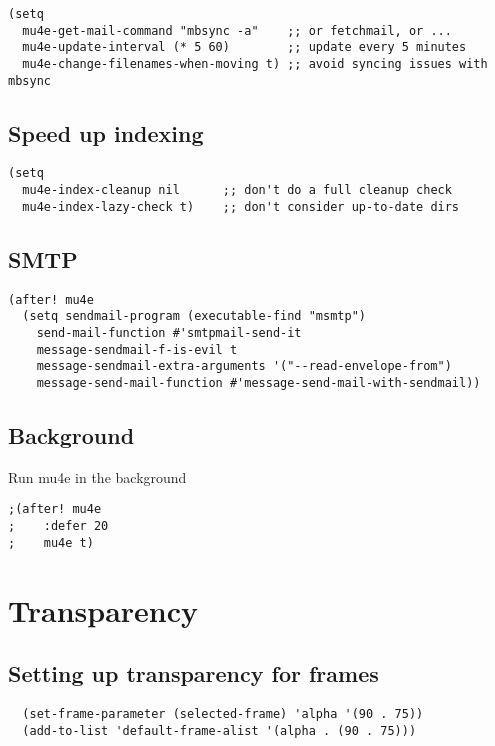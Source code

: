 \documentclass[11pt]{article}
\begin{document}
\begin{verbatim}
(setq
  mu4e-get-mail-command "mbsync -a"    ;; or fetchmail, or ...
  mu4e-update-interval (* 5 60)        ;; update every 5 minutes
  mu4e-change-filenames-when-moving t) ;; avoid syncing issues with mbsync
\end{verbatim}
\subsection{Speed up indexing}
\label{sec:org0d9be86}

\begin{verbatim}
(setq
  mu4e-index-cleanup nil      ;; don't do a full cleanup check
  mu4e-index-lazy-check t)    ;; don't consider up-to-date dirs
\end{verbatim}
\subsection{SMTP}
\label{sec:org27d6a9a}

\begin{verbatim}
(after! mu4e
  (setq sendmail-program (executable-find "msmtp")
	send-mail-function #'smtpmail-send-it
	message-sendmail-f-is-evil t
	message-sendmail-extra-arguments '("--read-envelope-from")
	message-send-mail-function #'message-send-mail-with-sendmail))
\end{verbatim}
\subsection{Background}
\label{sec:org4e23cc5}

Run mu4e in the background

\begin{verbatim}
;(after! mu4e
;    :defer 20
;    mu4e t)
\end{verbatim}
\section{Transparency}
\label{sec:org094b5c6}

\subsection{Setting up transparency for frames}
\label{sec:orgd4ed7f1}
\begin{verbatim}
  (set-frame-parameter (selected-frame) 'alpha '(90 . 75))
  (add-to-list 'default-frame-alist '(alpha . (90 . 75)))
\end{verbatim}
\end{document}
